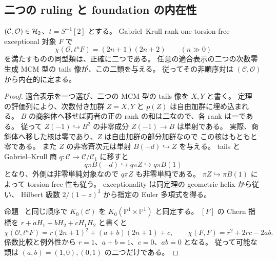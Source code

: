 \subsection{二つの ruling と foundation の内在性}

\begin{proposition}
\label{prop:intrinsic-ruling-pair}
$(\mathcal C,\mathcal O)\in\mathcal H_2$、$t=S^{-1}[2]$ とする。
Gabriel--Krull rank one torsion-free exceptional 対象 $F$ で
\[
 \chi(\mathcal O,t^nF)=(2n+1)(2n+2)\qquad(n\gg0)
\]
を満たすものの同型類は、正確に二つである。
任意の適合表示の二つの次数零生成 MCM 型の tails 像が、この二類を与える。
従ってその非順序対は $(\mathcal C,\mathcal O)$ から内在的に定まる。
\end{proposition}

\begin{proof}
適合表示を一つ選び、二つの MCM 型の tails 像を $X,Y$ と書く。
定理~\cite[\texttt{thm:normal-helix}]{QuadricIntrinsic2026} の評価列により、次数付き加群 $Z=X,Y$ と
$p(Z)$ は自由加群に埋め込まれる。
$B$ の商斜体へ移せば両者の正の rank の和は二なので、各 rank は一である。
従って $Z(-1)\hookrightarrow B^2$ の非零成分 $Z(-1)\to B$ は単射である。
実際、商斜体へ移した核は零であり、$Z$ は自由加群の部分加群なので
この核はもともと零である。
また $Z$ の非零斉次元は単射 $B(-d)\hookrightarrow Z$ を与える。
tails と Gabriel--Krull 商 $q:\mathcal C\to\mathcal C/\mathcal C_1$ に移すと
\[
 q\pi B(-d)\hookrightarrow q\pi Z\hookrightarrow q\pi B(1)
\]
となり、外側は非零単純対象なので $q\pi Z$ も非零単純である。
$\pi Z\hookrightarrow\pi B(1)$ によって torsion-free 性も従う。
exceptionality は同定理の geometric helix から従い、
Hilbert 級数 $2/(1-z)^3$ から指定の Euler 多項式を得る。

命題~\cite[\texttt{prop:first-orbit-object}]{QuadricIntrinsic2026} と同じ順序で
$K_0(\mathcal C)$ を $K_0(\mathbb P^1\times\mathbb P^1)$ と同定する。
$[F]$ の Chern 指標を $r+aH_1+bH_2+cH_1H_2$ と書くと
\[
 \chi(\mathcal O,t^nF)
 =r(2n+1)^2+(a+b)(2n+1)+c,\qquad
 \chi(F,F)=r^2+2rc-2ab.
\]
係数比較と例外性から $r=1$、$a+b=1$、$c=0$、$ab=0$ となる。
従って可能な類は $(a,b)=(1,0),(0,1)$ の二つだけである。


\end{proof}
